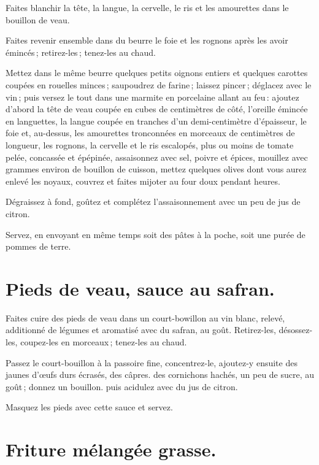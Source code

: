 Faites blanchir la tête, la langue, la cervelle, le ris et les amourettes dans
le bouillon de veau.

Faites revenir ensemble dans du beurre le foie et les rognons après les avoir
émincés ; retirez-les ; tenez-les au chaud.

Mettez dans le même beurre quelques petits oignons entiers et quelques carottes
coupées en rouelles minces ; saupoudrez de farine ; laissez pincer ; déglacez
avec le vin ; puis versez le tout dans une marmite en porcelaine allant au
feu : ajoutez d'abord la tête de veau coupée en cubes de {\mmm} centimètres de côté,
l'oreille émincée en languettes, la langue coupée en tranches d'un
demi-centimètre d'épaisseur, le foie et, au-dessus, les amourettes tronconnées
en morceaux de {\mmm} centimètres de longueur, les rognons, la cervelle et le ris
escalopés, plus ou moins de tomate pelée, concassée et épépinée, assaisonnez
avec sel, poivre et épices, mouillez avec {\mmm} grammes environ de bouillon de
cuisson, mettez quelques olives dont vous aurez enlevé les noyaux, couvrez et
faites mijoter au four doux pendant {\mmm} heures.

Dégraissez à fond, goûtez et complétez l'assaisonnement avec un peu de jus de
citron.

Servez, en envoyant en même temps soit des pâtes à la poche, soit une purée de
pommes de terre.

\section*{\centering Pieds de veau, sauce au safran.}
{}

Faites cuire des pieds de veau dans un court-bowillon au vin blanc, relevé,
additionné de légumes et aromatisé avec du safran, au goût. Retirez-les, désossez-
les, coupez-les en morceaux ; tenez-les au chaud.

Passez le court-bouillon à la passoire fine, concentrez-le, ajoutez-y ensuite
des jaunes d'œufs durs écrasés, des câpres. des cornichons hachés, un peu de
sucre, au goût ; donnez un bouillon. puis acidulez avec du jus de citron.

Masquez les pieds avec cette sauce et servez.

\section*{\centering Friture mélangée grasse.}
{}


